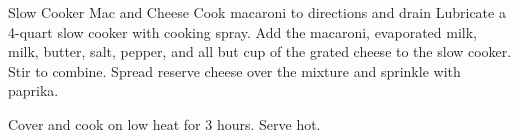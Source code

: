 \begin{recipe}{Slow Cooker Mac and Cheese}{}{}
Cook macaroni to directions and drain
Lubricate a 4-quart slow cooker with cooking spray. Add the macaroni,
evaporated milk, milk, butter, salt, pepper, and all but  cup of the
grated cheese to the slow cooker. Stir to combine. Spread reserve cheese over
the mixture and sprinkle with paprika.\newstep

Cover and cook on low heat for 3 hours. Serve hot.
\end{recipe}
